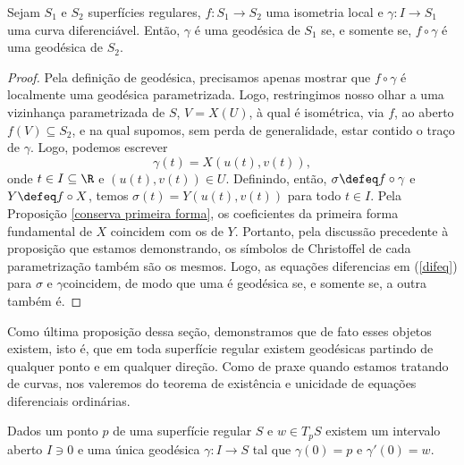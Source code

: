 \begin{prop}
    Sejam \( S_{ 1 } \) e \( S_{ 2 } \) superfícies regulares, \( f : S_{ 1 } \to S_{ 2 } \) uma isometria local e \( \gamma : I \to S_{ 1 } \) uma curva diferenciável.
    Então, \( \gamma \) é uma geodésica de \( S_{ 1 } \) se, e somente se, \( f \circ \gamma \) é uma geodésica de \( S_{ 2 } \).
    \label{nao varia por isometria}
\end{prop}

\begin{proof}
    Pela definição de geodésica, precisamos apenas mostrar que \( f \circ \gamma \) é localmente uma geodésica parametrizada.
    Logo, restringimos nosso olhar a uma vizinhança parametrizada de \( S \), \( V = X ( U ) \), à qual é isométrica, via \( f \), ao aberto \( f ( V ) \subseteq S_{ 2 } \), e na qual supomos, sem perda de generalidade, estar contido o traço de \( \gamma \).
    Logo, podemos escrever
    \begin{equation*}
        \gamma ( t ) = X ( u ( t ), v ( t ) )
    ,\end{equation*}
    onde \( t \in I \subseteq \R \) e \( ( u ( t ), v ( t ) ) \in U \).
    Definindo, então, \( \sigma \defeq f \circ \gamma \) e \( Y \defeq f \circ X \), temos \( \sigma ( t ) = Y ( u ( t ), v ( t ) ) \) para todo \( t \in I \).
    Pela Proposição \ref{conserva primeira forma}, os coeficientes da primeira forma fundamental de \( X \) coincidem com os de \( Y \).
    Portanto, pela discussão precedente à proposição que estamos demonstrando, os símbolos de Christoffel de cada parametrização também são os mesmos.
    Logo, as equações diferencias em (\ref{difeq}) para \( \sigma \) e \( \gamma \)coincidem, de modo que uma é geodésica se, e somente se, a outra também é.
\end{proof}

Como última proposição dessa seção, demonstramos que de fato esses objetos existem, isto é, que em toda superfície regular existem geodésicas partindo de qualquer ponto e em qualquer direção.
Como de praxe quando estamos tratando de curvas, nos valeremos do teorema de existência e unicidade de equações diferenciais ordinárias.

\begin{prop}
    Dados um ponto \( p \) de uma superfície regular \( S \) e \( w \in T_{ p } S \) existem um intervalo aberto \( I \ni 0 \) e uma única geodésica \( \gamma : I \to S \) tal que \( \gamma ( 0 ) = p \)  e \( \gamma' ( 0 ) = w \).
    \label{existe e unico}
\end{prop}

